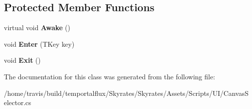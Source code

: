 \subsection*{Protected Member Functions}
\begin{DoxyCompactItemize}
\item 
\hypertarget{class_skyrates_1_1_u_i_1_1_canvas_selector_3_01_t_key_00_01_t_entry_01_4_a6d8360a551cbd8e061a5cc67bfef9ce0}{virtual void {\bfseries Awake} ()}\label{class_skyrates_1_1_u_i_1_1_canvas_selector_3_01_t_key_00_01_t_entry_01_4_a6d8360a551cbd8e061a5cc67bfef9ce0}

\item 
\hypertarget{class_skyrates_1_1_u_i_1_1_canvas_selector_3_01_t_key_00_01_t_entry_01_4_a1f26a9ea4c2e1f0b2fcd74caa9692232}{void {\bfseries Enter} (T\-Key key)}\label{class_skyrates_1_1_u_i_1_1_canvas_selector_3_01_t_key_00_01_t_entry_01_4_a1f26a9ea4c2e1f0b2fcd74caa9692232}

\item 
\hypertarget{class_skyrates_1_1_u_i_1_1_canvas_selector_3_01_t_key_00_01_t_entry_01_4_a898d9f9d556ee0566954a5f04a56306e}{void {\bfseries Exit} ()}\label{class_skyrates_1_1_u_i_1_1_canvas_selector_3_01_t_key_00_01_t_entry_01_4_a898d9f9d556ee0566954a5f04a56306e}

\end{DoxyCompactItemize}


The documentation for this class was generated from the following file\-:\begin{DoxyCompactItemize}
\item 
/home/travis/build/temportalflux/\-Skyrates/\-Skyrates/\-Assets/\-Scripts/\-U\-I/Canvas\-Selector.\-cs\end{DoxyCompactItemize}
